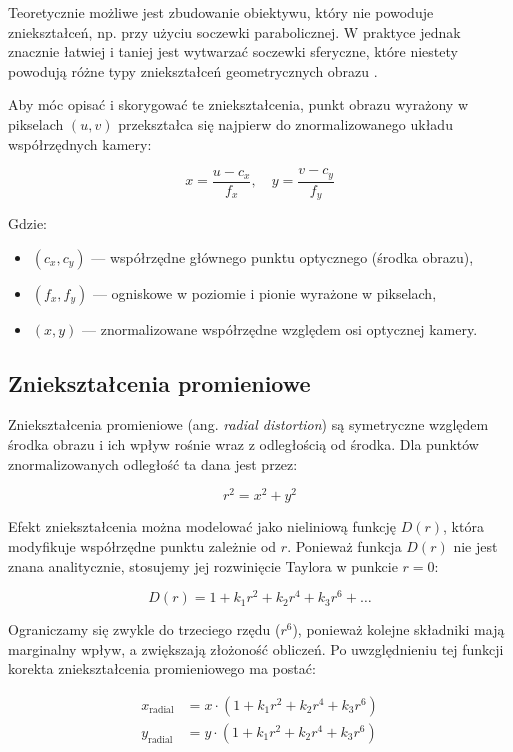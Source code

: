 \documentclass[magisterska]{pracadypl}
\begin{document}
Teoretycznie możliwe jest zbudowanie obiektywu, który nie powoduje zniekształceń, np. przy użyciu soczewki parabolicznej. W praktyce jednak znacznie łatwiej i taniej jest wytwarzać soczewki sferyczne, które niestety powodują różne typy zniekształceń geometrycznych obrazu \cite{dystorsja}.

Aby móc opisać i skorygować te zniekształcenia, punkt obrazu wyrażony w pikselach \( (u, v) \) przekształca się najpierw do znormalizowanego układu współrzędnych kamery:

\[
x = \frac{u - c_x}{f_x}, \quad y = \frac{v - c_y}{f_y}
\]

Gdzie:
\begin{itemize}
    \item \( (c_x, c_y) \) — współrzędne głównego punktu optycznego (środka obrazu),
    \item \( (f_x, f_y) \) — ogniskowe w poziomie i pionie wyrażone w pikselach,
    \item \( (x, y) \) — znormalizowane współrzędne względem osi optycznej kamery.
\end{itemize}

\subsection*{Zniekształcenia promieniowe}

Zniekształcenia promieniowe (ang. \textit{radial distortion}) \cite{promieniowe} są symetryczne względem środka obrazu i ich wpływ rośnie wraz z odległością od środka. Dla punktów znormalizowanych odległość ta dana jest przez:

\[
r^2 = x^2 + y^2
\]

Efekt zniekształcenia można modelować jako nieliniową funkcję \( D(r) \), która modyfikuje współrzędne punktu zależnie od \( r \). Ponieważ funkcja \( D(r) \) nie jest znana analitycznie, stosujemy jej rozwinięcie Taylora w punkcie \( r = 0 \):

\[
D(r) = 1 + k_1 r^2 + k_2 r^4 + k_3 r^6 + \ldots
\]

Ograniczamy się zwykle do trzeciego rzędu (\( r^6 \)), ponieważ kolejne składniki mają marginalny wpływ, a zwiększają złożoność obliczeń. Po uwzględnieniu tej funkcji korekta zniekształcenia promieniowego ma postać:

\begin{align*}
x_{\text{radial}} &= x \cdot \left(1 + k_1 r^2 + k_2 r^4 + k_3 r^6 \right) \\
y_{\text{radial}} &= y \cdot \left(1 + k_1 r^2 + k_2 r^4 + k_3 r^6 \right)
\end{align*}
\end{document}
